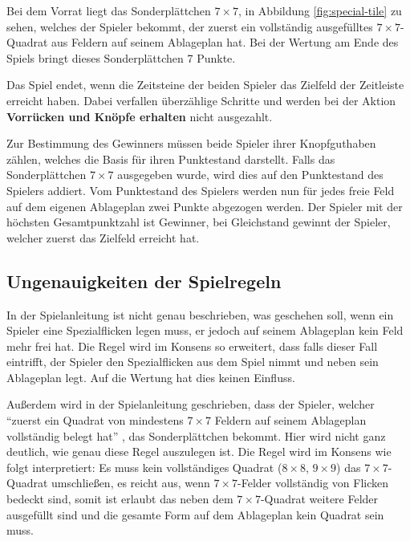 \phantom{ }

Bei dem Vorrat liegt das Sonderplättchen $7\times7$, in Abbildung \ref{fig:special-tile} zu sehen, welches der Spieler bekommt, der zuerst ein vollständig ausgefülltes $7\times7$-Quadrat aus Feldern auf seinem Ablageplan hat. Bei der Wertung am Ende des Spiels bringt dieses Sonderplättchen 7 Punkte. \cite{2014.PatchworkSpielanleitung}

\phantom{ }

Das Spiel endet, wenn die Zeitsteine der beiden Spieler das Zielfeld der Zeitleiste erreicht haben. Dabei verfallen überzählige Schritte und werden bei der Aktion \textbf{Vorrücken und Knöpfe erhalten} nicht ausgezahlt. \cite{2014.PatchworkSpielanleitung}

Zur Bestimmung des Gewinners müssen beide Spieler ihrer Knopfguthaben zählen, welches die Basis für ihren Punktestand darstellt. Falls das Sonderplättchen $7\times7$ ausgegeben wurde, wird dies auf den Punktestand des Spielers addiert. Vom Punktestand des Spielers werden nun für jedes freie Feld auf dem eigenen Ablageplan zwei Punkte abgezogen werden. Der Spieler mit der höchsten Gesamtpunktzahl ist Gewinner, bei Gleichstand gewinnt der Spieler, welcher zuerst das Zielfeld erreicht hat. \cite{2014.PatchworkSpielanleitung}

\subsection*{Ungenauigkeiten der Spielregeln}

In der Spielanleitung ist nicht genau beschrieben, was geschehen soll, wenn ein Spieler eine Spezialflicken legen muss, er jedoch auf seinem Ablageplan kein Feld mehr frei hat. Die Regel wird im Konsens so erweitert, dass falls dieser Fall eintrifft, der Spieler den Spezialflicken aus dem Spiel nimmt und neben sein Ablageplan legt. Auf die Wertung hat dies keinen Einfluss. \cite{2014.DiscussionSpecialPatch}

Außerdem wird in der Spielanleitung geschrieben, dass der Spieler, welcher \enquote{zuerst ein Quadrat von mindestens $7\times7$ Feldern auf seinem Ablageplan vollständig belegt hat} \cite{2014.PatchworkSpielanleitung}, das Sonderplättchen bekommt. Hier wird nicht ganz deutlich, wie genau diese Regel auszulegen ist. Die Regel wird im Konsens wie folgt interpretiert: Es muss kein vollständiges Quadrat ($8\times8$, $9\times9$) das $7\times7$-Quadrat umschließen, es reicht aus, wenn $7\times7$-Felder vollständig von Flicken bedeckt sind, somit ist erlaubt das neben dem $7\times7$-Quadrat weitere Felder ausgefüllt sind und die gesamte Form auf dem Ablageplan kein Quadrat sein muss. \cite{2014.Discussion7x7}

